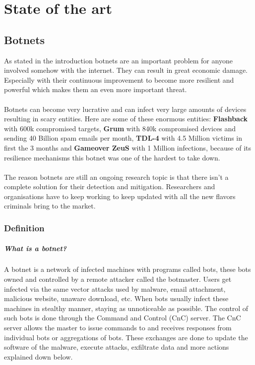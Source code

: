 
\chapter{State of the art}

\label{State of the art}

\cite{survey1}
\section{Botnets}
\cite{survey2}
As stated in the introduction botnets are an  important problem for anyone involved somehow with the internet. They can result in great economic damage.
\cite{report1} 
Especially with their continuous improvement to become more resilient and powerful which makes them an even more important threat.\\\\
\cite{pheonix} 
Botnets can become very lucrative and can infect very large amounts of devices resulting in scary entities. Here are some of these enormous entities: \textbf{Flashback} with 600k compromised targets, \textbf{Grum} with 840k compromised devices and sending 40 Billion spam emails per month, \textbf{TDL-4} with 4.5 Million victims in first the 3 months and \textbf{Gameover ZeuS} with 1 Million infections, because of its resilience mechanisms this botnet was one of the hardest to take down.\\\\
\cite{survey2}
The reason botnets are still an ongoing research topic is that there isn't a complete solution for their detection and mitigation. Researchers and organisations have to keep working to keep updated with all the new flavors criminals bring to the market.
\subsection{Definition}
\cite{memoire1}
\cite{detection1}
\paragraph{What is a botnet?} A botnet is a network of infected machines with programs called bots, these bots owned and controlled by a remote attacker called the botmaster. Users get infected via the same vector attacks used by malware, email attachment, malicious website, unaware download, etc. When bots usually infect these machines in stealthy manner, staying as unnoticeable as possible. The control of such bots is done through the Command and Control (CnC) server. The CnC server allows the master to issue commands to and receives responses from individual bots or aggregations of bots. These exchanges are done to update the software of the malware, execute attacks, exfiltrate data and more actions explained down below.
\cite{survey3}

